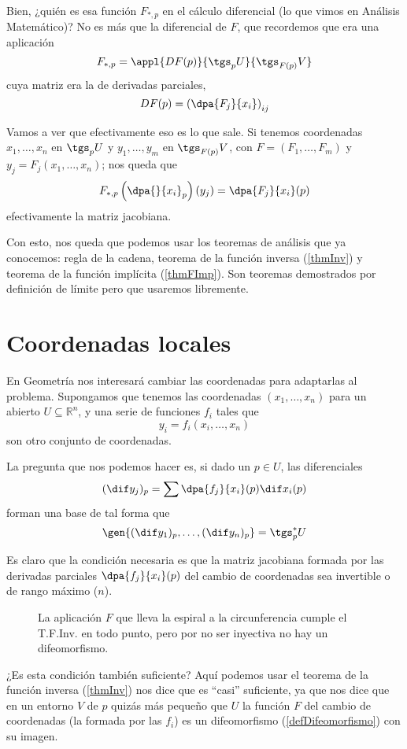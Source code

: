 Bien, ¿quién es esa función $F_{*,p}$ en el cálculo diferencial (lo que vimos en Análisis Matemático)? No es más que la diferencial de $F$, que recordemos que era una aplicación \[ F_{*,p} = \appl{DF(p)}{\tgs_p U} {\tgs_{F(p)}V}\] cuya matriz era la de derivadas parciales, \[ DF(p) = \left(\dpa{F_j}{x_i}\right)_{ij} \]

Vamos a ver que efectivamente eso es lo que sale. Si tenemos coordenadas $x_1, \dotsc, x_n$ en $\tgs_pU$ y $y_1, \dotsc, y_m$ en $\tgs_{F(p)} V$, con $F = (F_1, \dotsc, F_m)$ y $y_j = F_j (x_1, \dotsc, x_n)$; nos queda que \[ F_{*, p} \left(\dpa{}{x_i}_p\right)(y_j) = \dpa{F_j}{x_i} (p) \] efectivamente la matriz jacobiana.

Con esto, nos queda que podemos usar los teoremas de análisis que ya conocemos: regla de la cadena, teorema de la función inversa (\ref{thmInv}) y teorema de la función implícita (\ref{thmFImp}). Son teoremas demostrados por definición de límite pero que usaremos libremente.

\section{Coordenadas locales}

En Geometría nos interesará cambiar las coordenadas para adaptarlas al problema. Supongamos que tenemos las coordenadas $(x_1, \dotsc, x_n)$ para un abierto $U⊆ℝ^n$, y una serie de funciones $f_i$ tales que \[ y_i = f_i(x_i, \dotsc, x_n)\] son otro conjunto de coordenadas.

La pregunta que nos podemos hacer es, si dado un $p ∈ U$, las diferenciales \[ (\dif y_j)_p = \sum \dpa{f_j}{x_i}(p) \dif x_i (p)\] forman una base de tal forma que \[ \gen{(\dif y_1)_p, \dotsc, (\dif y_n)_p} = \tgs_p^* U \]

Es claro que la condición necesaria es que la matriz jacobiana formada por las derivadas parciales $\dpa{f_j}{x_i}(p)$ del cambio de coordenadas sea invertible o de rango máximo ($n$).

\begin{wrapfigure}{r}{0.4\textwidth}
\centering
{}
\caption{La aplicación $F$ que lleva la espiral a la circunferencia cumple el T.F.Inv. en todo punto, pero por no ser inyectiva no hay un difeomorfismo.}
\label{figEspiralDifeomorfismo}
\end{wrapfigure}

¿Es esta condición también suficiente? Aquí podemos usar el teorema de la función inversa (\ref{thmInv}) nos dice que es ``casi'' suficiente, ya que nos dice que en un entorno $V$ de $p$ quizás más pequeño que $U$ la función $F$ del cambio de coordenadas (la formada por las $f_i$) es un difeomorfismo (\ref{defDifeomorfismo}) con su imagen.


